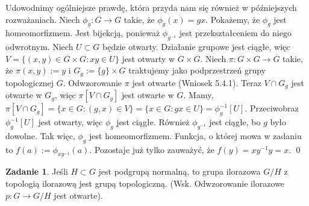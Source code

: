 \documentclass{article}
\theoremstyle{definition}%
\theoremstyle{theorem}
\newtheorem{zad}{Zadanie}
\renewenvironment{proof}{{\bfseries Rozwiązanie}}{\qed}
\begin{document}
	\begin{proof}
	Udowodnimy ogólniejsze prawdę, która przyda nam się również w późniejszych rozważaniach. Niech $\phi_{g}:G\to G$ takie, że $\phi_{g}(x)=gx$. Pokażemy, że $\phi_{g}$ jest homeomorfizmem.  Jest bijekcją, ponieważ $\phi_{g^{-1}}$ jest przekształceniem do niego odwrotnym. Niech $U\subset G$ będzie otwarty. Działanie grupowe jest ciągłe, więc $V=\{(x,y)\in G\times G:xy\in U\}$ jest otwarty w $G\times G$.  Niech $\pi:G\times G\to G$ takie, że $\pi (x,y):=y$ i $G_{g}:=\{g\}\times G$ traktujemy jako podprzestrzeń grupy topologicznej $G$. Odwzorowanie $\pi$ jest otwarte (Wniosek 5.4.1). Teraz $V\cap G_{g}$ jest otwarte w $G_{g}$, więc $\pi[V\cap G_{g}]$ jest otwarte w $G$.  Mamy, $\pi[V\cap G_{g}]=\{x\in G: (g,x)\in V\}=\{x\in G:gx\in U\}=\phi_{g}^{-1}[U]$. Przeciwobraz $\phi_{g}^{-1}[U]$ jest otwarty, więc $\phi_{g}$ jest ciągłe. Również $\phi_{g^{-1}}$ jest ciągłe, bo $g$ było dowolne. Tak więc, $\phi_{g}$ jest homeomorfizmem. Funkcja, o której mowa w zadaniu to $f(a):=\phi_{xy^{-1}}(a)$. Pozostaje już tylko zauważyć, że $f(y)=xy^{-1}y=x$.
	\end{proof}
	\begin{zad}
Jeśli $H\subset G$ jest podgrupą normalną, to grupa ilorazowa $G/H$ z topologią ilorazową jest grupą topologiczną. (Wsk. Odwzorowanie ilorazowe $p\colon G \to G/H$ jest otwarte). 
	\end{zad}
\end{document}
